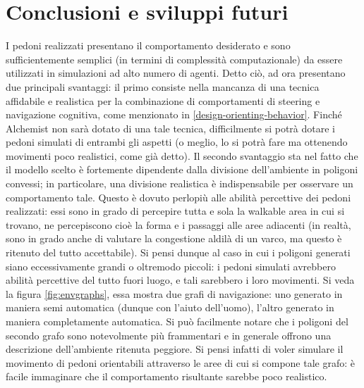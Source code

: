 \documentclass[12pt,a4paper,openright,oneside]{book}
\begin{document}
\chapter{Conclusioni e sviluppi futuri}
\label{chap:conclusions}
I pedoni realizzati presentano il comportamento desiderato e sono sufficientemente semplici (in termini di complessità computazionale) da essere utilizzati in simulazioni ad alto numero di agenti. Detto ciò, ad ora presentano due principali svantaggi: il primo consiste nella mancanza di una tecnica affidabile e realistica per la combinazione di comportamenti di steering e navigazione cognitiva, come menzionato in \ref{design-orienting-behavior}. Finché Alchemist non sarà dotato di una tale tecnica, difficilmente si potrà dotare i pedoni simulati di entrambi gli aspetti (o meglio, lo si potrà fare ma ottenendo movimenti poco realistici, come già detto). Il secondo svantaggio sta nel fatto che il modello scelto è fortemente dipendente dalla divisione dell'ambiente in poligoni convessi; in particolare, una divisione realistica è indispensabile per osservare un comportamento tale. Questo è dovuto perlopiù alle abilità percettive dei pedoni realizzati: essi sono in grado di percepire tutta e sola la walkable area in cui si trovano, ne percepiscono cioè la forma e i passaggi alle aree adiacenti (in realtà, sono in grado anche di valutare la congestione aldilà di un varco, ma questo è ritenuto del tutto accettabile). Si pensi dunque al caso in cui i poligoni generati siano eccessivamente grandi o oltremodo piccoli: i pedoni simulati avrebbero abilità percettive del tutto fuori luogo, e tali sarebbero i loro movimenti. Si veda la figura \cref{fig:envgraphs}, essa mostra due grafi di navigazione: uno generato in maniera semi automatica (dunque con l'aiuto dell'uomo), l'altro generato in maniera completamente automatica. Si può facilmente notare che i poligoni del secondo grafo sono notevolmente più frammentari e in generale offrono una descrizione dell'ambiente ritenuta peggiore. Si pensi infatti di voler simulare il movimento di pedoni orientabili attraverso le aree di cui si compone tale grafo: è facile immaginare che il comportamento risultante sarebbe poco realistico.
\end{document}

